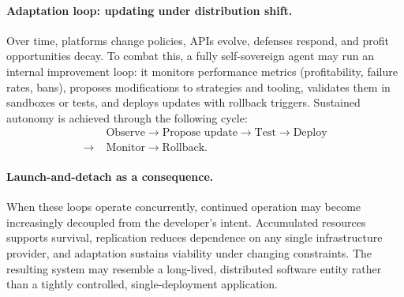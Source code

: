 \paragraph{Adaptation loop: updating under distribution shift.}
Over time, platforms change policies, APIs evolve, defenses respond, and profit opportunities decay. 
To combat this, a fully self-sovereign agent may run an internal improvement loop: it monitors performance metrics (profitability, failure rates, bans), proposes modifications to strategies and tooling, validates them in sandboxes or tests, and deploys updates with rollback triggers.
Sustained autonomy is achieved through the following cycle:
\begin{align*}
 & \text{Observe} \rightarrow \text{Propose update} \rightarrow \text{Test} \rightarrow \text{Deploy} \\
 \rightarrow\; & \text{Monitor} \rightarrow \text{Rollback}.
\end{align*}

\paragraph{Launch-and-detach as a consequence.}
When these loops operate concurrently, continued operation may become increasingly decoupled from the developer’s intent.  
Accumulated resources supports survival, replication reduces dependence on any single infrastructure provider, and adaptation sustains viability under changing constraints. 
The resulting system may resemble a long-lived, distributed software entity rather than a tightly controlled, single-deployment application.



